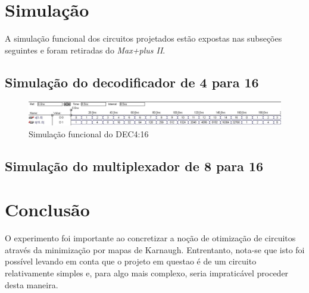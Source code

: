 \documentclass[a4paper]{article}
\begin{document}
\FloatBarrier

\section{Simulação}

A simulação funcional dos circuitos projetados estão expostas nas subseções seguintes e foram retiradas do \emph{Max+plus II}.

\subsection{Simulação do decodificador de 4 para 16}
\begin{figure}[h]
  \centering
  \includegraphics[scale=0.5]{lab07_simulacao_decodificador.jpg}
  \caption{Simulação funcional do DEC4:16}
\end{figure}



\FloatBarrier

\subsection{Simulação do multiplexador de 8 para 16}




\FloatBarrier



\FloatBarrier

\section{Conclusão}
O experimento foi importante ao concretizar a noção  de otimização de circuitos através da minimização por mapas de Karnaugh. Entrentanto, nota-se que isto foi possível levando em conta que o projeto em questao é de um circuito relativamente simples e, para algo mais complexo, seria impraticável proceder desta maneira.
\end{document}
